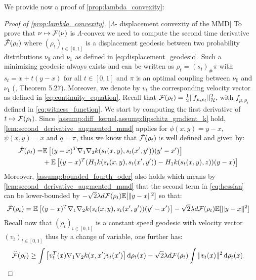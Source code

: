 We provide now a proof of \cref{prop:lambda_convexity}:
\begin{proof}[Proof of \cref{prop:lambda_convexity}]\label{proof:prop:lambda_convexity}[$\Lambda$- displacement convexity of the MMD]
To prove that $\nu\mapsto {{\mathcal F}}(\nu)$ is $\Lambda$-convex
we need to compute the second time derivative $\ddot{{{\mathcal F}}}(\rho_{t})$
where $(\rho_{t})_{t \in [0,1]}$ is a displacement geodesic between two probability
distributions $\nu_{0}$ and $\nu_{1}$ as defined in \cref{eq:displacement_geodesic}. Such a minimizing geodesic always exists and can be written as $\rho_t = (s_t)_{\#}\pi$ with $s_t = x + t(y-x)$ for all $t\in [0,1]$ and $\pi$ is an optimal coupling between $\nu_0$ and $\nu_1$ (\cite{Santambrogio:2015}, Theorem 5.27). Moreover, we denote by $v_t$ the corresponding velocity vector as defined in \cref{eq:continuity_equation}. Recall that ${{\mathcal F}}(\rho_t) = \frac{1}{2} \Vert f_{\mu,\rho_t}\Vert^2_{\mathcal{H}}$, with $f_{\mu,\rho_t}$ defined in \cref{eq:witness_function}. %
We start by computing the first derivative of $ t\mapsto {{\mathcal F}}(\rho_t) $. Since \cref{assump:diff_kernel,assump:lipschitz_gradient_k} hold, \cref{lem:second_derivative_augmented_mmd} applies for $\phi(x,y) = y-x$, $\psi(x,y) = x$ and $q = \pi$, thus we know that $\ddot{{{\mathcal F}}}(\rho_t)$ is well defined and given by:
\begin{align}\label{eq:hessian}
\begin{split}
	\ddot{{{\mathcal F}}}(\rho_t) =&\mathbb{E}\left[ (y-x)^T\nabla_1 \nabla_2 k(s_t(x,y),s_t(x',y'))(y'-x')\right]\\
&+ \mathbb{E}\left[ (y-x)^T( H_1 k(s_t(x,y),s_t(x',y'))-H_1 k(s_t(x,y),z))(y-x)\right]
\end{split}
\end{align}
Moreover, \cref{assump:bounded_fourth_oder} also holds which means by \cref{lem:second_derivative_augmented_mmd} that the second term in \cref{eq:hessian} can be lower-bounded by $-\sqrt{2}\lambda d{{\mathcal F}}(\rho_t)\mathbb{E}[ \Vert y-x \Vert^2]$ so that:
\[
\ddot{{{\mathcal F}}}(\rho_t) =\mathbb{E}\left[ (y-x)^T\nabla_1 \nabla_2 k(s_t(x,y),s_t(x',y'))(y'-x')\right] - \sqrt{2}\lambda d{{\mathcal F}}(\rho_t) \mathbb{E}[ \Vert y-x \Vert^2]
\]
Recall now that $(\rho_t)_{t \in [0,1]}$ is a constant speed geodesic with velocity vector $(v_t)_{t\in [0,1]}$ thus by a change of variable, one further has:
\[
\ddot{{{\mathcal F}}}(\rho_t) \geq\int\left[ v_t^T(x)\nabla_1 \nabla_2 k(x,x')v_t(x')\right]\mathop{}\!\mathrm{d} \rho_t(x) - \sqrt{2}\lambda d{{\mathcal F}}(\rho_t) \int \Vert v_t(x) \Vert^2 \mathop{}\!\mathrm{d} \rho_t(x).
\]
\end{proof}
